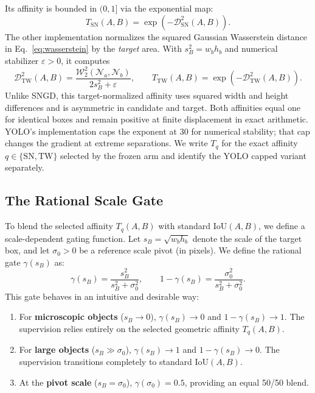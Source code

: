 \documentclass[11pt,a4paper]{article}
\begin{document}
Its affinity is bounded in $(0, 1]$ via the exponential map:
\begin{equation}
  T_{\mathrm{SN}}(A, B) = \exp\left(-\mathcal{D}_{\mathrm{SN}}^2(A, B)\right).
\end{equation}
The other implementation normalizes the squared Gaussian Wasserstein distance in Eq.~\eqref{eq:wasserstein} by the \emph{target} area. With $s_B^2=w_bh_b$ and numerical stabilizer $\varepsilon>0$, it computes
\begin{equation}
  \label{eq:target_w2}
  \mathcal{D}_{\mathrm{TW}}^2(A,B)
  = \frac{\mathcal{W}_2^2(\mathcal{N}_a,\mathcal{N}_b)}{2s_B^2+\varepsilon},
  \qquad T_{\mathrm{TW}}(A,B)=\exp\!\left(-\mathcal{D}_{\mathrm{TW}}^2(A,B)\right).
\end{equation}
Unlike SNGD, this target-normalized affinity uses squared width and height differences and is asymmetric in candidate and target. Both affinities equal one for identical boxes and remain positive at finite displacement in exact arithmetic. YOLO's implementation caps the exponent at 30 for numerical stability; that cap changes the gradient at extreme separations. We write $T_q$ for the exact affinity $q\in\{\mathrm{SN},\mathrm{TW}\}$ selected by the frozen arm and identify the YOLO capped variant separately.

\subsection{The Rational Scale Gate}
To blend the selected affinity $T_q(A, B)$ with standard $\mathrm{IoU}(A, B)$, we define a scale-dependent gating function. Let $s_B = \sqrt{w_b h_b}$ denote the scale of the target box, and let $\sigma_0 > 0$ be a reference scale pivot (in pixels). We define the rational gate $\gamma(s_B)$ as:
\begin{equation}
  \label{eq:gamma}
  \gamma(s_B) = \frac{s_B^2}{s_B^2 + \sigma_0^2}, \qquad
  1 - \gamma(s_B) = \frac{\sigma_0^2}{s_B^2 + \sigma_0^2}.
\end{equation}
This gate behaves in an intuitive and desirable way:
\begin{enumerate}
  \item For \textbf{microscopic objects} ($s_B \to 0$), $\gamma(s_B) \to 0$ and $1 - \gamma(s_B) \to 1$. The supervision relies entirely on the selected geometric affinity $T_q(A, B)$.
  \item For \textbf{large objects} ($s_B \gg \sigma_0$), $\gamma(s_B) \to 1$ and $1 - \gamma(s_B) \to 0$. The supervision transitions completely to standard $\mathrm{IoU}(A, B)$.
  \item At the \textbf{pivot scale} ($s_B = \sigma_0$), $\gamma(\sigma_0) = 0.5$, providing an equal 50/50 blend.
\end{enumerate}
\end{document}
